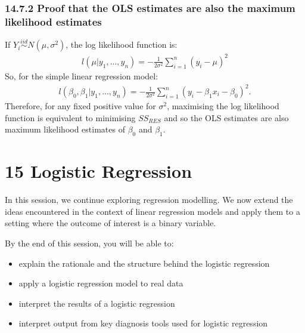 \documentclass[letterpaper,10pt,english]{jupyterBook}
\begin{document}
\subsection{14.7.2 Proof that the OLS estimates are also the maximum likelihood estimates}
\label{\detokenize{14.h. Linear Regression III:proof-that-the-ols-estimates-are-also-the-maximum-likelihood-estimates}}
\sphinxAtStartPar
If \(Y_i \overset{iid}{\sim} N(\mu, \sigma^2)\), the log likelihood function is:
\begin{equation*}
\begin{split}
l(\mu | y_1,...,y_n) = -\frac{1}{2\sigma^2}\sum_{i=1}^n (y_i - \mu)^2
\end{split}
\end{equation*}
\sphinxAtStartPar
So, for the simple linear regression model:
\begin{equation*}
\begin{split}
l(\beta_0, \beta_1 | y_1,...,y_n) = -\frac{1}{2\sigma^2}\sum_{i=1}^n (y_i - \beta_1x_i-\beta_0)^2.
\end{split}
\end{equation*}
\sphinxAtStartPar
Therefore, for any fixed positive value for \(\sigma^2\), maximising the log likelihood function is equivalent to minimising \(SS_{RES}\) and so the OLS estimates are also maximum likelihood estimates of \(\beta_0\) and \(\beta_1\).


\chapter{15 Logistic Regression}
\label{\detokenize{15.a. Logistic Regression:logistic-regression}}\label{\detokenize{15.a. Logistic Regression::doc}}
\sphinxAtStartPar
In this session, we continue exploring regression modelling. We now extend the ideas encountered in the context of linear regression models and apply them to a setting where the outcome of interest is a binary variable.



\sphinxAtStartPar
By the end of this session, you will be able to:
\begin{itemize}
\item {} 
\sphinxAtStartPar
explain the rationale and the structure behind the logistic regression

\item {} 
\sphinxAtStartPar
apply a logistic regression model to real data

\item {} 
\sphinxAtStartPar
interpret the results of a logistic regression

\item {} 
\sphinxAtStartPar
interpret output from key diagnosis tools used for logistic regression

\end{itemize}
\end{document}
